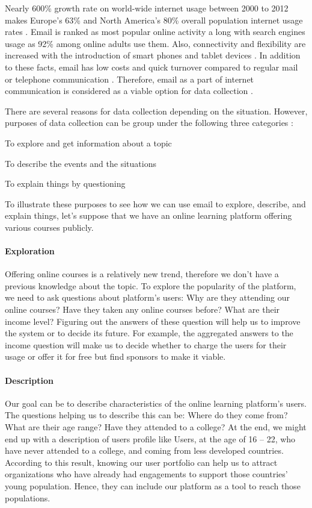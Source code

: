 Nearly 600\% growth rate on world-wide internet usage between 2000 to 2012 makes Europe's 63\% and North America's 80\% overall population internet usage rates \cite{InternetWorldStats2012}. Email is ranked as most popular online activity a long with search engines usage as 92\% among online adults use them\cite{Purcell2011}. Also, connectivity and flexibility are increased with the introduction of smart phones and tablet devices \cite{Madden2008}. In addition to these facts, email has low costs and quick turnover compared to regular mail or telephone communication \cite{Zikmund2007}. Therefore, email as a part of internet communication is considered as a viable option for data collection \cite{Zikmund2007}.
\vspace{1cm}

There are several reasons for data collection depending on the situation. However, purposes of data collection can be group under the following three categories \cite[pages 92--94]{Babbie2010}:

\begin{compactenum}
	\item To explore and get information about a topic
	\item To describe the events and the situations
	\item To explain things by questioning
\end{compactenum}

To illustrate these purposes to see how we can use email to explore, describe, and explain things, let's suppose that we have an online learning platform offering various courses publicly.

\paragraph{Exploration}
Offering online courses is a relatively new trend, therefore we don't have a previous knowledge about the topic. To explore the popularity of the platform, we need to ask questions about platform's users: Why are they attending our online courses? Have they taken any online courses before? What are their income level? Figuring out the answers of these question will help us to improve the system or to decide its future. For example, the aggregated answers to the income question will make us to decide whether to charge the users for their usage or offer it for free but find sponsors to make it viable.

\paragraph{Description}
Our goal can be to describe characteristics of the online learning platform's users. The questions helping us to describe this can be: Where do they come from? What are their age range? Have they attended to a college? At the end, we might end up with a description of users profile like Users, at the age of 16 -- 22, who have never attended to a college, and coming from less developed countries. According to this result, knowing our user portfolio can help us to attract organizations who have already had engagements to support those countries' young population. Hence, they can include our platform as a tool to reach those populations.

